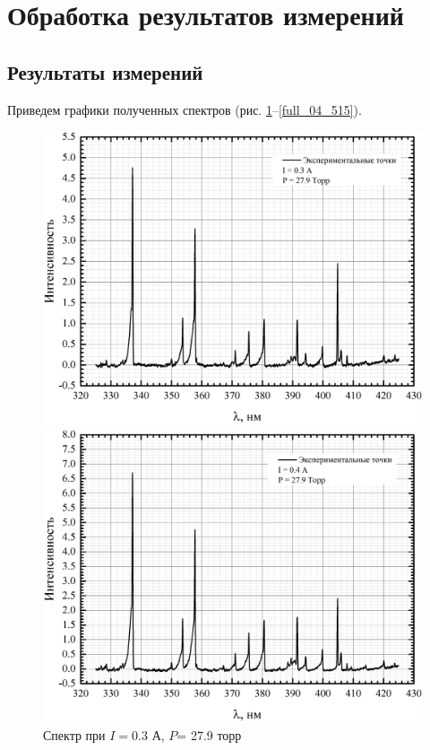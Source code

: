 \section{Обработка результатов измерений}
\subsection{Результаты измерений}
Приведем графики полученных спектров (рис. \ref{full_03_279}--\ref{full_04_515}).
\begin{figure}[H]
	\begin{minipage}{0.45\linewidth}
		\centering
		\includegraphics[width=\linewidth]{full_03_279}
		\caption{Спектр при $I= 0.3$ А, $P$= 27.9 торр}
		\label{full_03_279}
	\end{minipage} 
	\hfill
	\begin{minipage}[H]{0.45\linewidth}
		\centering
		\includegraphics[width=\linewidth]{full_04_279}

\end{minipage}
\end{figure}
